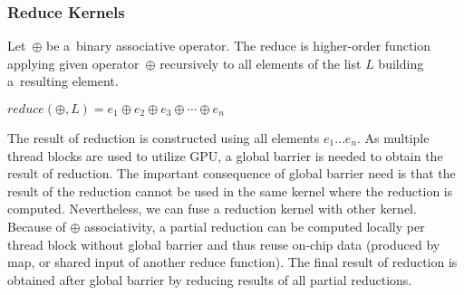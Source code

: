 \documentclass[final]{siamltex}
\begin{document}
\subsubsection{Reduce Kernels}

Let~$\oplus$ be a~binary associative operator. The reduce is higher-order function applying given operator~$\oplus$ recursively to all elements of the list $L$ building a~resulting element.

\begin{center}
$reduce(\oplus, L) = e_1 \oplus e_2 \oplus e_3 \oplus \dotsb \oplus e_n$
\end{center}

The result of reduction is constructed using all elements $e_1 \dots e_n$. As multiple thread blocks are used to utilize GPU, a global barrier is needed to obtain the result of reduction. The important consequence of global barrier need is that the result of the reduction cannot be used in the same kernel where the reduction is computed. Nevertheless, we can fuse a reduction kernel with other kernel. Because of $\oplus$ associativity, a partial reduction can be computed locally per thread block without global barrier and thus reuse on-chip data (produced by map, or shared input of another reduce function). The final result of reduction is obtained after global barrier by reducing results of all partial reductions. 
\end{document}
